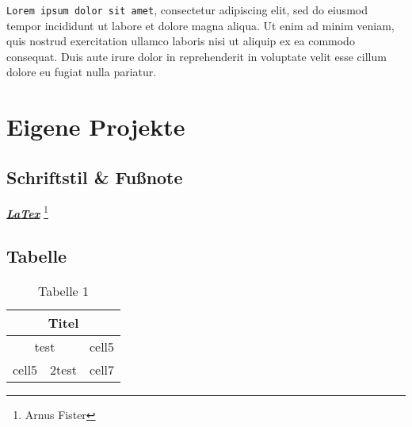 \documentclass[12pt, a4paper]{article} %
\begin{document}
\texttt{Lorem ipsum dolor sit amet}, consectetur adipiscing elit, sed do eiusmod tempor incididunt ut labore et dolore magna aliqua. Ut enim ad minim veniam, quis nostrud exercitation ullamco laboris nisi ut aliquip ex ea commodo consequat. Duis aute irure dolor in reprehenderit in voluptate velit esse cillum dolore eu fugiat nulla pariatur.



\section{Eigene Projekte}
%
%
\subsection{Schriftstil \& Fußnote}
\underline{\textbf{\textit{LaTex}}}
%
\footnote{Arnus Fister}
%
%
\subsection{Tabelle}
%
\begin{table}[h]
    \caption{Tabelle 1}

\centering
\begin{tabular}{|c|c|c|}
\hline
\multicolumn{3}{|c|}{Titel}\\
\hline
\multicolumn{2}{|c|}{test} & cell5\\
\hline
cell5 & 2test & cell7\\
\hline


\end{tabular}

\end{table}

















\end{document}
